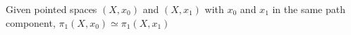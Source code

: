 \documentclass[preview]{standalone}
\begin{document}
\begin{center}
Given pointed spaces $(X,x_0)$ and $(X,x_1)$ with $x_0$ and $x_1$ in the same path component, $\pi_1(X,x_0)\simeq\pi_1(X,x_1)$
\end{center}
\end{document}

